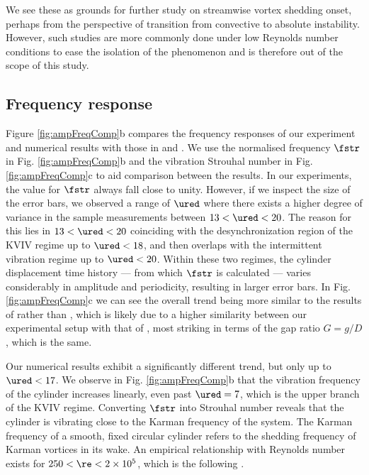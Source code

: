\documentclass[a4paper,fleqn]{cas-sc}
\begin{document}
We see these as grounds for further study on streamwise vortex shedding onset, perhaps from the perspective of transition from convective to absolute instability. However, such studies are more commonly done under low Reynolds number conditions \citep{Wang2019,Li2019} to ease the isolation of the phenomenon and is therefore out of the scope of this study.

\subsection{Frequency response} \label{ssec:freResp}
Figure \ref{fig:ampFreqComp}b compares the frequency responses of our experiment and numerical results with those in \citet{Nguyen2012} and \citet{Koide2013}. We use the normalised frequency  $\fstr$ in Fig. \ref{fig:ampFreqComp}b and the vibration Strouhal number in Fig. \ref{fig:ampFreqComp}c to aid comparison between the results. In our experiments, the value for  $\fstr$ always fall close to unity. However, if we inspect the size of the error bars, we observed a range of  $\ured$ where there exists a higher degree of variance in the sample measurements between  $13 < \ured < 20$. The reason for this lies in  $13 < \ured < 20$ coinciding with the desynchronization region of the KVIV regime up to  $\ured < 18$, and then overlaps with the intermittent vibration regime up to  $\ured < 20$. Within these two regimes, the cylinder displacement time history --- from which  $\fstr$ is calculated --- varies considerably in amplitude and periodicity, resulting in larger error bars. In Fig. \ref{fig:ampFreqComp}c we can see the overall trend being more similar to the results of \citet{Koide2013} rather than \citet{Nguyen2012}, which is likely due to a higher similarity between our experimental setup with that of \citet{Koide2013}, most striking in terms of the gap ratio  $G = g/D$, which is the same.

Our numerical results exhibit a significantly different trend, but only up to  $\ured < 17$. We observe in Fig. \ref{fig:ampFreqComp}b that the vibration frequency of the cylinder increases linearly, even past  $\ured = 7$, which is the upper branch of the KVIV regime. Converting  $\fstr$ into Strouhal number reveals that the cylinder is vibrating close to the Karman frequency of the system. The Karman frequency of a smooth, fixed circular cylinder refers to the shedding frequency of Karman vortices in its wake. An empirical relationship with Reynolds number exists for  $250 < \re < 2 \times 10^{5}$, which is the following \citet{Blevins1990}.
\end{document}

